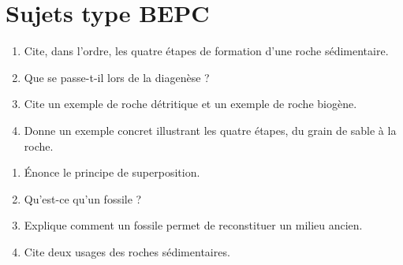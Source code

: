 \section{Sujets type BEPC}

\begin{enumerate}[label=\arabic*)]
\item Cite, dans l'ordre, les quatre étapes de formation d'une roche sédimentaire.
\item Que se passe-t-il lors de la diagenèse ?
\item Cite un exemple de roche détritique et un exemple de roche biogène.
\item Donne un exemple concret illustrant les quatre étapes, du grain de sable à la
roche.
\end{enumerate}

\begin{enumerate}[label=\arabic*)]
\item Énonce le principe de superposition.
\item Qu'est-ce qu'un fossile ?
\item Explique comment un fossile permet de reconstituer un milieu ancien.
\item Cite deux usages des roches sédimentaires.
\end{enumerate}

